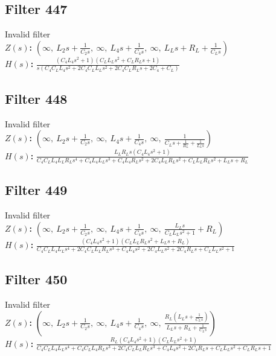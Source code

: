 \documentclass{article}
\begin{document}
\subsection*{Filter 447}
Invalid filter \\ 
\textbf{$Z(s)$:} $\left( \infty, \  L_{2} s + \frac{1}{C_{2} s}, \  \infty, \  L_{4} s + \frac{1}{C_{4} s}, \  \infty, \  L_{L} s + R_{L} + \frac{1}{C_{L} s}\right)$ \\ 
\textbf{$H(s)$:} $\frac{\left(C_{4} L_{4} s^{2} + 1\right) \left(C_{L} L_{L} s^{2} + C_{L} R_{L} s + 1\right)}{s \left(C_{4} C_{L} L_{4} s^{2} + 2 C_{4} C_{L} L_{L} s^{2} + 2 C_{4} C_{L} R_{L} s + 2 C_{4} + C_{L}\right)}$ \\ 
\subsection*{Filter 448}
Invalid filter \\ 
\textbf{$Z(s)$:} $\left( \infty, \  L_{2} s + \frac{1}{C_{2} s}, \  \infty, \  L_{4} s + \frac{1}{C_{4} s}, \  \infty, \  \frac{1}{C_{L} s + \frac{1}{R_{L}} + \frac{1}{L_{L} s}}\right)$ \\ 
\textbf{$H(s)$:} $\frac{L_{L} R_{L} s \left(C_{4} L_{4} s^{2} + 1\right)}{C_{4} C_{L} L_{4} L_{L} R_{L} s^{4} + C_{4} L_{4} L_{L} s^{3} + C_{4} L_{4} R_{L} s^{2} + 2 C_{4} L_{L} R_{L} s^{2} + C_{L} L_{L} R_{L} s^{2} + L_{L} s + R_{L}}$ \\ 
\subsection*{Filter 449}
Invalid filter \\ 
\textbf{$Z(s)$:} $\left( \infty, \  L_{2} s + \frac{1}{C_{2} s}, \  \infty, \  L_{4} s + \frac{1}{C_{4} s}, \  \infty, \  \frac{L_{L} s}{C_{L} L_{L} s^{2} + 1} + R_{L}\right)$ \\ 
\textbf{$H(s)$:} $\frac{\left(C_{4} L_{4} s^{2} + 1\right) \left(C_{L} L_{L} R_{L} s^{2} + L_{L} s + R_{L}\right)}{C_{4} C_{L} L_{4} L_{L} s^{4} + 2 C_{4} C_{L} L_{L} R_{L} s^{3} + C_{4} L_{4} s^{2} + 2 C_{4} L_{L} s^{2} + 2 C_{4} R_{L} s + C_{L} L_{L} s^{2} + 1}$ \\ 
\subsection*{Filter 450}
Invalid filter \\ 
\textbf{$Z(s)$:} $\left( \infty, \  L_{2} s + \frac{1}{C_{2} s}, \  \infty, \  L_{4} s + \frac{1}{C_{4} s}, \  \infty, \  \frac{R_{L} \left(L_{L} s + \frac{1}{C_{L} s}\right)}{L_{L} s + R_{L} + \frac{1}{C_{L} s}}\right)$ \\ 
\textbf{$H(s)$:} $\frac{R_{L} \left(C_{4} L_{4} s^{2} + 1\right) \left(C_{L} L_{L} s^{2} + 1\right)}{C_{4} C_{L} L_{4} L_{L} s^{4} + C_{4} C_{L} L_{4} R_{L} s^{3} + 2 C_{4} C_{L} L_{L} R_{L} s^{3} + C_{4} L_{4} s^{2} + 2 C_{4} R_{L} s + C_{L} L_{L} s^{2} + C_{L} R_{L} s + 1}$ \\ 
\end{document}
